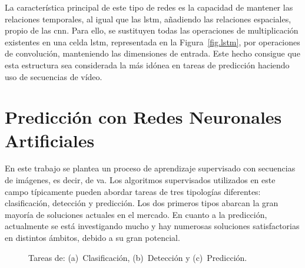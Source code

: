 La característica principal de este tipo de redes es la capacidad de mantener las relaciones temporales, al igual que las \acrshort{lstm}, añadiendo las relaciones espaciales, propio de las \acrshort{cnn}. Para ello, se sustituyen todas las operaciones de multiplicación existentes en una celda \acrshort{lstm}, representada en la Figura~\ref{fig.lstm}, por operaciones de convolución, manteniendo las dimensiones de entrada. Este hecho consigue que esta estructura sea considerada la más idónea en tareas de predicción haciendo uso de secuencias de vídeo.

\section{Predicción con Redes Neuronales Artificiales}
En este trabajo se plantea un proceso de aprendizaje supervisado con secuencias de imágenes, es decir, de \acrshort{va}. Los algoritmos supervisados utilizados en este campo típicamente pueden abordar tareas de tres tipologías diferentes: clasificación, detección y predicción. Los dos primeros tipos abarcan la gran mayoría de soluciones actuales en el mercado. En cuanto a la predicción, actualmente se está investigando mucho y hay numerosas soluciones satisfactorias en distintos ámbitos, debido a su gran potencial.\\

\begin{figure}[H]
		\begin{center}
			 \hspace{10pt}
	         \hspace{10pt}
	        \caption{Tareas de: (a)~Clasificación, (b)~Detección y (c)~Predicción.}
			\label{fig.problemas}
		\end{center}
\end{figure}
\vspace{-10pt}

